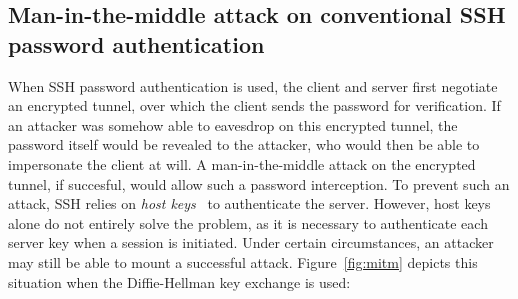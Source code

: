 \subsection{Man-in-the-middle attack on conventional SSH password authentication}  
\label{subsec:ssh-mitm}
When SSH password authentication is used, the client and server first
negotiate an encrypted tunnel, over which the client sends the
password for verification.  If an attacker was somehow able to
eavesdrop on this encrypted tunnel, the password itself would be
revealed to the attacker, who would then be able to impersonate
the client at will.  A man-in-the-middle attack on the encrypted
tunnel, if succesful, would allow such a password interception.
To prevent such an attack, SSH relies on \emph{host
keys}~\cite{rfc4252} to authenticate the server. However, host keys
alone do not entirely solve the problem, as it is necessary to
authenticate each server key when a session is initiated. Under
certain circumstances, an attacker may still be able to mount a
successful attack. Figure~\ref{fig:mitm} depicts this situation when
the Diffie-Hellman key exchange is used:
